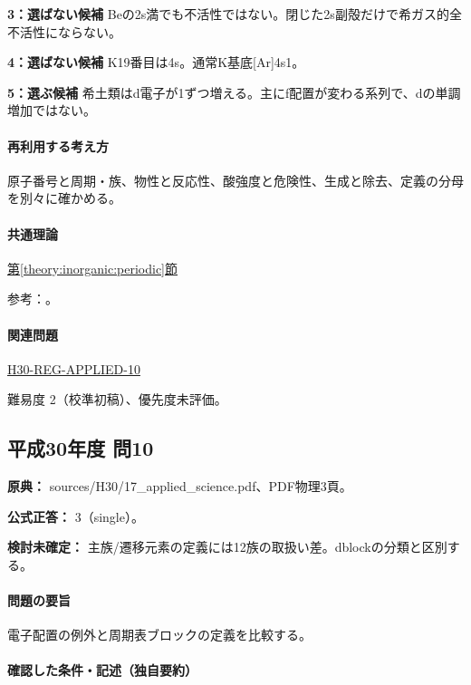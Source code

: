 \noindent\textbf{3：選ばない候補} Beの2s満でも不活性ではない。閉じた2s副殻だけで希ガス的全不活性にならない。\par

\noindent\textbf{4：選ばない候補} K19番目は4s。通常K基底[Ar]4s1。\par

\noindent\textbf{5：選ぶ候補} 希土類はd電子が1ずつ増える。主にf配置が変わる系列で、dの単調増加ではない。\par

\paragraph{再利用する考え方} 原子番号と周期・族、物性と反応性、酸強度と危険性、生成と除去、定義の分母を別々に確かめる。

\paragraph{共通理論} \hyperref[theory:inorganic:periodic]{第\ref*{theory:inorganic:periodic}節}

\par 参考：\cite{atomic_nist2019,inorganic_periodic_ref}。

\paragraph{関連問題} \hyperref[q:h30-reg-applied-10]{H30-REG-APPLIED-10}

\par 難易度 2（校準初稿）、優先度未評価。

\subsection{平成30年度 問10}
\label{q:h30-reg-applied-10}

\noindent\textbf{原典：} sources/H30/17\_applied\_science.pdf、PDF物理3頁。

\textbf{公式正答：} 3（single）。

\par\textbf{検討未確定：} 主族/遷移元素の定義には12族の取扱い差。dblockの分類と区別する。

\paragraph{問題の要旨} 電子配置の例外と周期表ブロックの定義を比較する。

\paragraph{確認した条件・記述（独自要約）}\mbox{}\par

